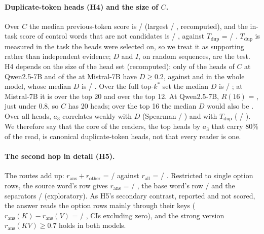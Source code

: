 \paragraph{Duplicate-token heads (H4) and the size of $C$.} Over $C$ the median previous-token score is \HcPrevOptQwenSeven{} / \HcPrevOptMistralSeven{} (largest \HfourPrevMaxQwenSeven{} / \HfourPrevMaxMistralSeven{}, recomputed), and the in-task score of control words that are not candidates is \HcTctrlOptQwenSeven{} / \HcTctrlOptMistralSeven{}, against $T_{\mathrm{dup}}$ = \HfourTQwenSeven{} / \HfourTMistralSeven{}. $T_{\mathrm{dup}}$ is measured in the task the heads were selected on, so we treat it as supporting rather than independent evidence; $D$ and $I$, on random sequences, are the test. H4 depends on the size of the head set (recomputed): only \HfourNDgeQwenSeven{} of the \HfourKCQwenSeven{} heads of $C$ at Qwen2.5-7B and \HfourNDgeMistralSeven{} of the \HfourKCMistralSeven{} at Mistral-7B have $D \geq 0.2$, against \HfourNDgeWholeQwenSeven{} and \HfourNDgeWholeMistralSeven{} in the whole model, whose median $D$ is \HfourDwholeQwenSeven{} / \HfourDwholeMistralSeven{}. Over the full top-$k^*$ set the median $D$ is \HfourDkstarQwenSeven{} / \HfourDkstarMistralSeven{}; at Mistral-7B it is \HfourDtopTwentyMistralSeven{} over the top 20 and \HfourDtopTwelveMistralSeven{} over the top 12. At Qwen2.5-7B, $R(16)$ = \HoneRsixteenQwenSeven{}, just under 0.8, so $C$ has 20 heads; over the top 16 the median $D$ would also be \HfourDtopSixteenQwenSeven{}. Over all heads, $a_3$ correlates weakly with $D$ (Spearman \HfourRhoDQwenSeven{} / \HfourRhoDMistralSeven{}) and with $T_{\mathrm{dup}}$ (\HfourRhoTQwenSeven{} / \HfourRhoTMistralSeven{}). We therefore say that the core of the readers, the top heads by $a_3$ that carry 80\% of the read, is canonical duplicate-token heads, not that every reader is one.

\paragraph{The second hop in detail (H5).} The routes add up: $r_{\mathrm{ans}} + r_{\mathrm{other}}$ = \HhopSumOptQwenSeven{} / \HhopSumOptMistralSeven{} against $r_{\mathrm{all}}$ = \HfiveAllQwenSeven{} / \HfiveAllMistralSeven{}. Restricted to single option rows, the source word's row gives $r_{\mathrm{ans}}$ = \HhoprowRowsAnsKVOptQwenSeven{} / \HhoprowRowsAnsKVOptMistralSeven{}, the base word's row \HhoprowRowbAnsKVOptQwenSeven{} / \HhoprowRowbAnsKVOptMistralSeven{} and the separators \HhoprowSepAnsKVOptQwenSeven{} / \HhoprowSepAnsKVOptMistralSeven{} (exploratory). As H5's secondary contrast, reported and not scored, the answer reads the option rows mainly through their keys ($r_{\mathrm{ans}}(K) - r_{\mathrm{ans}}(V)$ = \HfiveKminusVQwenSeven{} / \HfiveKminusVMistralSeven{}, CIs excluding zero), and the strong version $r_{\mathrm{ans}}(KV) \geq 0.7$ holds in both models.

